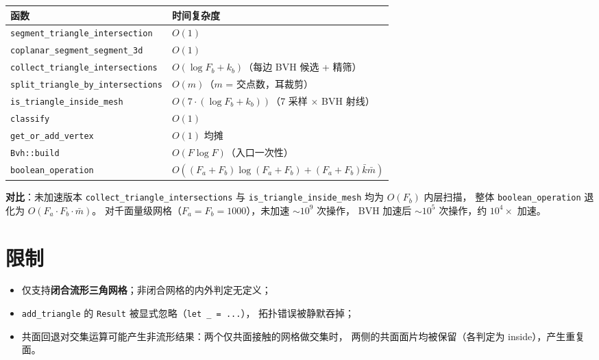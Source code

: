 \documentclass[11pt,a4paper]{article}
\begin{document}
\begin{center}
\renewcommand{\arraystretch}{1.18}
\begin{tabular}{@{}ll@{}}
  \toprule
  \textbf{函数} & \textbf{时间复杂度} \\
  \midrule
  \texttt{segment\_triangle\_intersection} & $O(1)$ \\
  \texttt{coplanar\_segment\_segment\_3d}  & $O(1)$ \\
  \texttt{collect\_triangle\_intersections}& $O(\log F_b + k_b)$（每边 BVH 候选 + 精筛） \\
  \texttt{split\_triangle\_by\_intersections}& $O(m)$（$m$ = 交点数，耳裁剪） \\
  \texttt{is\_triangle\_inside\_mesh}      & $O(7 \cdot (\log F_b + k_b))$（7 采样 $\times$ BVH 射线） \\
  \texttt{classify}                        & $O(1)$ \\
  \texttt{get\_or\_add\_vertex}            & $O(1)$ 均摊 \\
  \texttt{Bvh::build}                      & $O(F \log F)$（入口一次性） \\
  \texttt{boolean\_operation}              & $O((F_a + F_b)\log(F_a + F_b) + (F_a + F_b)\bar{k}\bar{m})$ \\
  \bottomrule
\end{tabular}
\end{center}

\textbf{对比}：未加速版本 \texttt{collect\_triangle\_intersections} 与
\texttt{is\_triangle\_inside\_mesh} 均为 $O(F_b)$ 内层扫描，
整体 \texttt{boolean\_operation} 退化为 $O(F_a \cdot F_b \cdot \bar{m})$。
对千面量级网格（$F_a = F_b = 1000$），未加速 $\sim 10^9$ 次操作，
BVH 加速后 $\sim 10^5$ 次操作，约 $10^4\times$ 加速。

\section{限制}

\begin{itemize}
  \item 仅支持\textbf{闭合流形三角网格}；非闭合网格的内外判定无定义；
  \item \texttt{add\_triangle} 的 \texttt{Result} 被显式忽略（\texttt{let \_ = ...}），
        拓扑错误被静默吞掉；
  \item 共面回退对交集运算可能产生非流形结果：两个仅共面接触的网格做交集时，
        两侧的共面面片均被保留（各判定为 inside），产生重复面。
\end{itemize}
\end{document}
